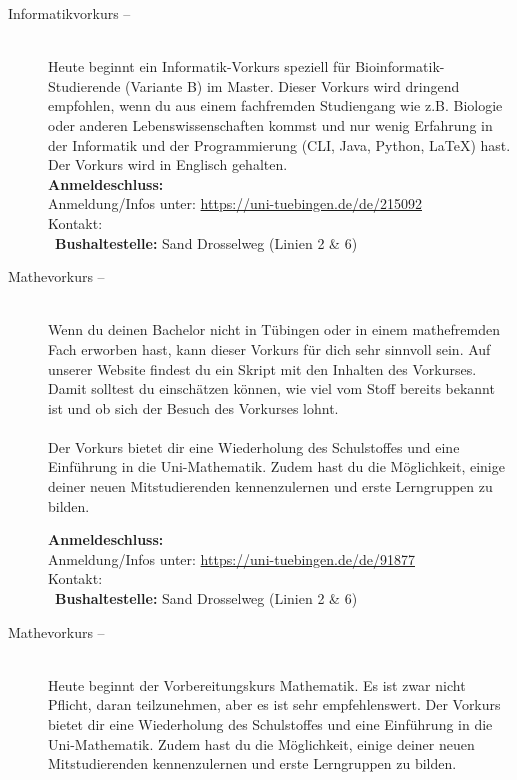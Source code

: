 \begin{description}
\ifmaster
    \ifbinfo
        \item[Informatikvorkurs -- \bioinfoDatum~\YEAR]\ \\
		Heute beginnt ein Informatik-Vorkurs speziell für Bioinformatik-Studierende (Variante B) im Master. 
		Dieser Vorkurs wird dringend empfohlen, wenn du aus einem fachfremden Studiengang wie z.B. Biologie oder anderen Lebenswissenschaften kommst und nur wenig Erfahrung in der Informatik und der Programmierung (CLI, Java, Python, \LaTeX) hast. Der Vorkurs wird in Englisch gehalten. \\
		\textbf{Anmeldeschluss:} \bioinfoAnmeldung\YEAR\\
		Anmeldung/Infos unter: \url{https://uni-tuebingen.de/de/215092}\\
		Kontakt: \texttt{\bioinfoKontakt}\\
        ~\textbf{Bushaltestelle:} Sand Drosselweg (Linien 2 \& 6)
    \fi
\fi

\ifmaster
	\ifml %
	\else
		\ifkogwiss %
		\else
			\iflehramt %
			\else
				\item[Mathevorkurs -- \mathedatum~\YEAR]~\\
				Wenn du deinen Bachelor nicht in Tübingen oder in einem mathefremden Fach erworben hast, kann dieser Vorkurs für dich sehr sinnvoll sein. Auf unserer Website findest du ein Skript mit den Inhalten des Vorkurses. Damit solltest du einschätzen können, wie viel vom Stoff bereits bekannt ist und ob sich der Besuch des Vorkurses lohnt.\\\\
				Der Vorkurs bietet dir eine Wiederholung des Schulstoffes und eine Einführung in die Uni-Mathematik. Zudem hast du die Möglichkeit, einige deiner neuen Mitstudierenden kennenzulernen und erste Lerngruppen zu bilden.

				\textbf{Anmeldeschluss:} \matheanmeldung\YEAR\\
				Anmeldung/Infos unter: \url{https://uni-tuebingen.de/de/91877}\\
				Kontakt: \texttt{\mathkontakt}\\
				\ifsommersemester
				~\textbf{Bushaltestelle:} Sand Drosselweg (Linien 2 \& 6) 
				\fi
			\fi
		\fi
	\fi
\fi

\ifbachelor
	\item[Mathevorkurs -- \mathedatum~\YEAR]~\\
	Heute beginnt der Vorbereitungskurs Mathematik. Es ist zwar nicht Pflicht, daran teilzunehmen, aber es ist sehr empfehlenswert.
	Der Vorkurs bietet dir eine Wiederholung des Schulstoffes und eine Einführung in die Uni-Mathematik. Zudem hast du die Möglichkeit, einige deiner neuen Mitstudierenden kennenzulernen und erste Lerngruppen zu bilden.


\end{description}
